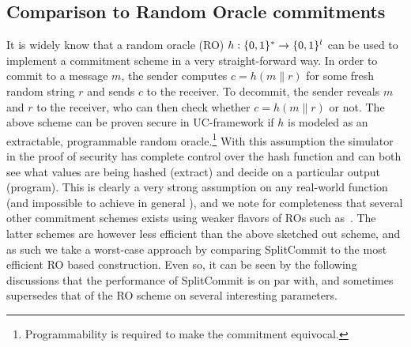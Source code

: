\subsection{Comparison to Random Oracle commitments}
It is widely know that a random oracle (RO) $h:\{0,1\}^* \to \{0,1\}^l$ can be used to implement a commitment scheme in a very straight-forward way. In order to commit to a message $m$, the sender computes $c = h(m\|r)$ for some fresh random string $r$ and sends $c$ to the receiver. To decommit, the sender reveals $m$ and $r$ to the receiver, who can then check whether $c = h(m\|r)$ or not. The above scheme can be proven secure in UC-framework if $h$ is modeled as an extractable, programmable random oracle.\footnote{Programmability is required to make the commitment equivocal.} With this assumption the simulator in the proof of security has complete control over the hash function and can both see what values are being hashed (extract) and decide on a particular output (program). This is clearly a very strong assumption on any real-world function (and impossible to achieve in general \cite{DBLP:conf/stoc/CanettiGH98}), and we note for completeness that several other commitment schemes exists using weaker flavors of ROs such as~\cite{DBLP:conf/tcc/HofheinzM04,DBLP:conf/ccs/Canetti0S14}. The latter schemes are however less efficient than the above sketched out scheme, and as such we take a worst-case approach by comparing SplitCommit to the most efficient RO based construction. Even so, it can be seen by the following discussions that the performance of SplitCommit is on par with, and sometimes supersedes that of the RO scheme on several interesting parameters.

